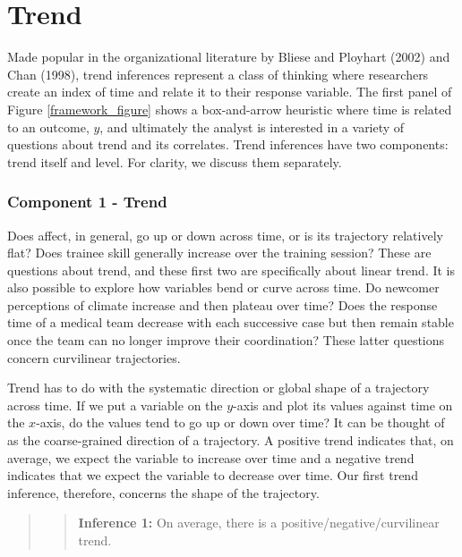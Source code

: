 \documentclass[english,,man]{apa6}
\begin{document}
\hypertarget{trend}{%
\section{Trend}\label{trend}}

Made popular in the organizational literature by Bliese and Ployhart (2002) and Chan (1998), trend inferences represent a class of thinking where researchers create an index of time and relate it to their response variable. The first panel of Figure \ref{framework_figure} shows a box-and-arrow heuristic where time is related to an outcome, \(y\), and ultimately the analyst is interested in a variety of questions about trend and its correlates. Trend inferences have two components: trend itself and level. For clarity, we discuss them separately.

\hypertarget{component-1---trend}{%
\subsubsection{Component 1 - Trend}\label{component-1---trend}}

Does affect, in general, go up or down across time, or is its trajectory relatively flat? Does trainee skill generally increase over the training session? These are questions about trend, and these first two are specifically about linear trend. It is also possible to explore how variables bend or curve across time. Do newcomer perceptions of climate increase and then plateau over time? Does the response time of a medical team decrease with each successive case but then remain stable once the team can no longer improve their coordination? These latter questions concern curvilinear trajectories.

Trend has to do with the systematic direction or global shape of a trajectory across time. If we put a variable on the \(y\)-axis and plot its values against time on the \(x\)-axis, do the values tend to go up or down over time? It can be thought of as the coarse-grained direction of a trajectory. A positive trend indicates that, on average, we expect the variable to increase over time and a negative trend indicates that we expect the variable to decrease over time. Our first trend inference, therefore, concerns the shape of the trajectory.

\begin{quote}
\begin{quote}
\textbf{Inference 1:} On average, there is a positive/negative/curvilinear trend.
\end{quote}
\end{quote}
\end{document}
